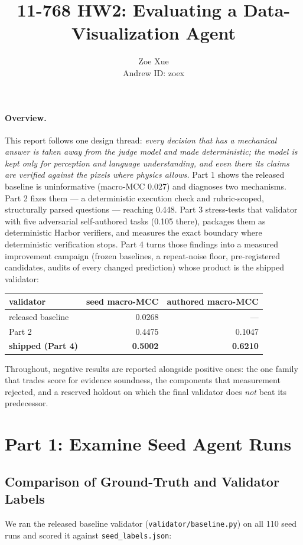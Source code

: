 \documentclass[11pt]{article}
\title{11-768 HW2: Evaluating a Data-Visualization Agent}
\author{Zoe Xue \\ Andrew ID: zoex}
\date{}
\begin{document}
\maketitle

\paragraph*{Overview.} This report follows one design thread: \emph{every
decision that has a mechanical answer is taken away from the judge model
and made deterministic; the model is kept only for perception and
language understanding, and even there its claims are verified against
the pixels where physics allows.} Part 1 shows the released baseline is
uninformative (macro-MCC 0.027) and diagnoses two mechanisms. Part 2
fixes them --- a deterministic execution check and rubric-scoped,
structurally parsed questions --- reaching 0.448. Part 3 stress-tests
that validator with five adversarial self-authored tasks (0.105 there),
packages them as deterministic Harbor verifiers, and measures the exact
boundary where deterministic verification stops. Part 4 turns those
findings into a measured improvement campaign (frozen baselines, a
repeat-noise floor, pre-registered candidates, audits of every changed
prediction) whose product is the shipped validator:

\begin{center}
\begin{tabular}{lrr}
\toprule
validator & seed macro-MCC & authored macro-MCC \\
\midrule
released baseline & 0.0268 & --- \\
Part 2 & 0.4475 & 0.1047 \\
\textbf{shipped (Part 4)} & \textbf{0.5002} & \textbf{0.6210} \\
\bottomrule
\end{tabular}
\end{center}

Throughout, negative results are reported alongside positive ones: the
one family that trades score for evidence soundness, the components that
measurement rejected, and a reserved holdout on which the final
validator does \emph{not} beat its predecessor.

\section{Part 1: Examine Seed Agent Runs}

\subsection{Comparison of Ground-Truth and Validator Labels}
We ran the released baseline validator (\texttt{validator/baseline.py}) on all
110 seed runs and scored it against \texttt{seed\_labels.json}:
\end{document}

